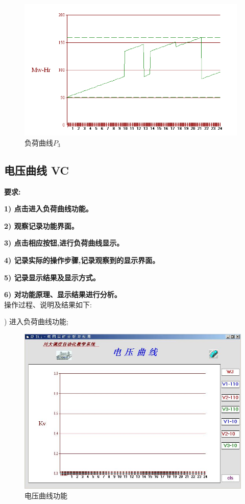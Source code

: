 \documentclass[a4paper]{ctexrep}
\begin{document}
                    \begin{figure}[htbp]
                        \centering
                        \includegraphics[width=11cm]{29.png} 
                        \caption{负荷曲线$P_3$}
                    \end{figure}

                \newpage

                \subsection{电压曲线 VC}
                    \textbf{要求:}

                    \quad \textbf{1) 点击进入负荷曲线功能。}

                    \quad \textbf{2) 观察记录功能界面。}

                    \quad \textbf{3) 点击相应按钮,进行负荷曲线显示。}

                    \quad \textbf{4) 记录实际的操作步骤,记录观察到的显示界面。}

                    \quad \textbf{5) 记录显示结果及显示方式。}

                    \quad \textbf{6) 对功能原理、显示结果进行分析。} \\

                    操作过程、说明及结果如下:

                    ) 进入负荷曲线功能;

                    \begin{figure}[htbp]
                        \centering
                        \includegraphics[width=12cm]{30.png} 
                        \caption{电压曲线功能}
                    \end{figure}
\end{document}
